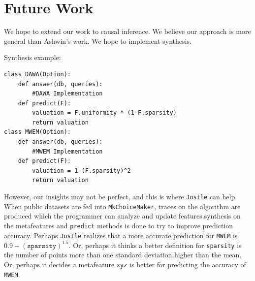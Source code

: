 \documentclass[11pt]{report}
\newcommand{\Jostle}{\texttt{Jostle}}
\renewcommand{\t}[1]{\texttt{#1}}
\begin{document}
\chapter{Future Work}
We hope to extend our work to causal inference. We believe our approach is more general than Ashwin's work. We hope to implement synthesis.

Synthesis example:
\begin{lstlisting}
class DAWA(Option):
    def answer(db, queries):
        #DAWA Implementation
    def predict(F):
        valuation = F.uniformity * (1-F.sparsity)
        return valuation
class MWEM(Option):
    def answer(db, queries):
        #MWEM Implementation
    def predict(F):
        valuation = 1-(F.sparsity)^2
        return valuation
\end{lstlisting}

However, our insights may not be perfect, and this is where \Jostle{} can help. When public datasets are fed into \t{MkChoiceMaker}, traces on the algorithm are produced which the programmer can analyze and update features.synthesis on the metafeatures and \t{predict} methods is done to try to improve prediction accuracy. Perhaps \Jostle{} realizes that a more accurate prediction for \t{MWEM} is $0.9-(\t{sparsity})^{1.5}$. Or, perhaps it thinks a better definition for \t{sparsity} is the number of points more than one standard deviation higher than the mean. Or, perhaps it decides a metafeature \t{xyz} is better for predicting the accuracy of \t{MWEM}.



\end{document}
